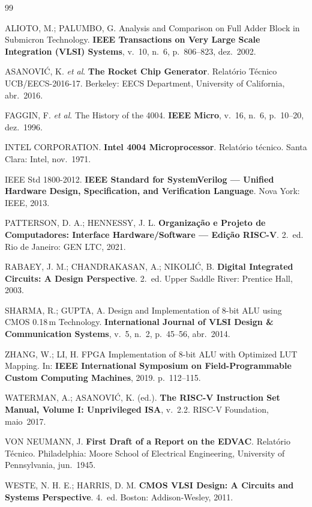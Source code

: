 \documentclass[12pt,a4paper]{article}
\begin{document}
\begin{thebibliography}{99}
\setlength{\itemsep}{6pt}

  ALIOTO, M\@.; PALUMBO, G\@.
  Analysis and Comparison on Full Adder Block in Submicron Technology.
  \textbf{IEEE Transactions on Very Large Scale Integration (VLSI) Systems},
  v.~10, n.~6, p.~806--823, dez.\ 2002.

  ASANOVI\'{C}, K\@. \textit{et al}.
  \textbf{The Rocket Chip Generator}.
  Relat\'{o}rio T\'{e}cnico UCB/EECS-2016-17. Berkeley: EECS Department, University of California, abr.\ 2016.

  FAGGIN, F\@. \textit{et al}.
  The History of the 4004.
  \textbf{IEEE Micro}, v.~16, n.~6, p.~10--20, dez.\ 1996.

  INTEL CORPORATION\@.
  \textbf{Intel 4004 Microprocessor}.
  Relat\'{o}rio t\'{e}cnico. Santa Clara: Intel, nov.\ 1971.

  IEEE Std 1800-2012.
  \textbf{IEEE Standard for SystemVerilog --- Unified Hardware Design,
  Specification, and Verification Language}.
  Nova York: IEEE, 2013.

  PATTERSON, D\@. A\@.; HENNESSY, J\@. L\@.
  \textbf{Organiza\c{c}\~{a}o e Projeto de Computadores: Interface Hardware/Software
  --- Edi\c{c}\~{a}o RISC-V}. 2.~ed.
  Rio de Janeiro: GEN LTC, 2021.

  RABAEY, J\@. M\@.; CHANDRAKASAN, A\@.; NIKOLI\'{C}, B\@.
  \textbf{Digital Integrated Circuits: A Design Perspective}. 2.~ed.
  Upper Saddle River: Prentice Hall, 2003.

  SHARMA, R\@.; GUPTA, A\@.
  Design and Implementation of 8-bit ALU using CMOS 0.18\,\textmu m Technology.
  \textbf{International Journal of VLSI Design \& Communication Systems},
  v.~5, n.~2, p.~45--56, abr.\ 2014.

  ZHANG, W\@.; LI, H\@.
  FPGA Implementation of 8-bit ALU with Optimized LUT Mapping.
  In: \textbf{IEEE International Symposium on Field-Programmable Custom Computing Machines}, 2019. p.~112--115.

  WATERMAN, A\@.; ASANOVI\'{C}, K\@. (ed.).
  \textbf{The RISC-V Instruction Set Manual, Volume I: Unprivileged ISA},
  v.~2.2. RISC-V Foundation, maio~2017.

  VON NEUMANN, J\@.
  \textbf{First Draft of a Report on the EDVAC}.
  Relat\'{o}rio T\'{e}cnico. Philadelphia: Moore School of Electrical Engineering,
  University of Pennsylvania, jun.\ 1945.

  WESTE, N\@. H\@. E\@.; HARRIS, D\@. M\@.
  \textbf{CMOS VLSI Design: A Circuits and Systems Perspective}. 4.~ed.
  Boston: Addison-Wesley, 2011.

\end{thebibliography}
\end{document}
